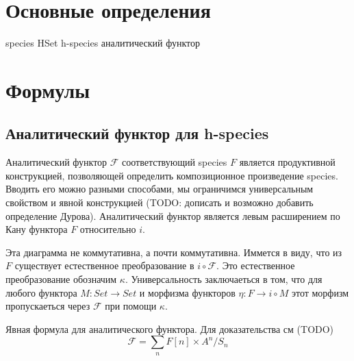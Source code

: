 \section{Основные определения}

species
HSet
h-species
аналитический функтор

\section{Формулы}

\subsection{Аналитический функтор для h-species}
Аналитический функтор $\mathcal F$ соответствующий species $F$ является
продуктивной конструкцией, позволяющей определить композиционное произведение
species. Вводить его можно разными способами, мы ограничимся универсальным
свойством и явной конструкцией (TODO: дописать и возможно добавить определение
Дурова). Аналитический функтор является левым расширением по Кану функтора $F$
относительно $i$.


Эта диаграмма не коммутативна, а почти коммутативна. Иммется в виду, что из
$F$ существует естественное преобразование в $i \circ \mathcal F$.
Это естественное преобразование обозначим $\kappa$.
Универсальность заключаеться в том, что для любого функтора $M \colon
Set \rightarrow Set$ и морфизма функторов $\eta \colon F \rightarrow i \circ M$
этот морфизм пропускаеться через $\mathcal F$ при помощи $\kappa$.



Явная формула для аналитического функтора. Для доказательства см (TODO)
\begin{equation}
\label{eq:an}
	\mathcal F = \sum\limits_n F[n] \times A^n / S_n
\end{equation}

